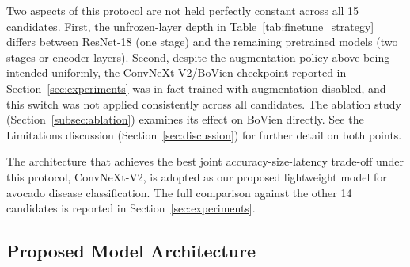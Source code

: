 Two aspects of this protocol are not held perfectly constant across all 15 candidates. First, the unfrozen-layer depth in Table~\ref{tab:finetune_strategy} differs between ResNet-18 (one stage) and the remaining pretrained models (two stages or encoder layers). Second, despite the augmentation policy above being intended uniformly, the ConvNeXt-V2/BoVien checkpoint reported in Section~\ref{sec:experiments} was in fact trained with augmentation disabled, and this switch was not applied consistently across all candidates. The ablation study (Section~\ref{subsec:ablation}) examines its effect on BoVien directly. See the Limitations discussion (Section~\ref{sec:discussion}) for further detail on both points.

The architecture that achieves the best joint accuracy-size-latency trade-off under this protocol, ConvNeXt-V2, is adopted as our proposed lightweight model for avocado disease classification. The full comparison against the other 14 candidates is reported in Section~\ref{sec:experiments}.

\subsection{Proposed Model Architecture}
\label{subsec:proposed_architecture}


